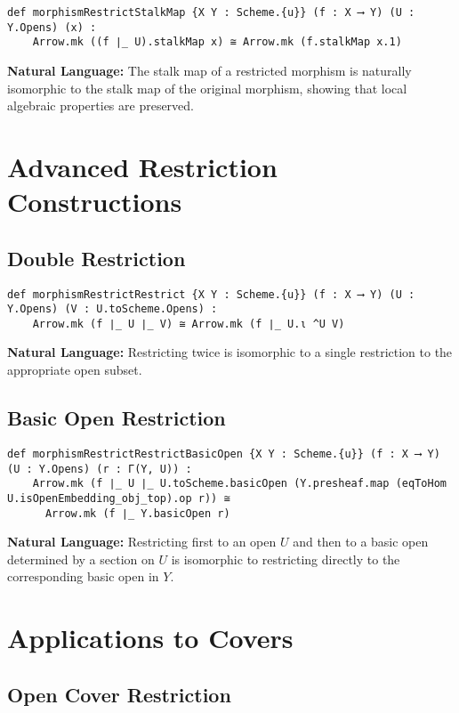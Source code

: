 \documentclass{article}
\theoremstyle{definition}
\begin{document}
\begin{lstlisting}
def morphismRestrictStalkMap {X Y : Scheme.{u}} (f : X ⟶ Y) (U : Y.Opens) (x) :
    Arrow.mk ((f ∣_ U).stalkMap x) ≅ Arrow.mk (f.stalkMap x.1)
\end{lstlisting}

\textbf{Natural Language:} The stalk map of a restricted morphism is naturally isomorphic to the stalk map of the original morphism, showing that local algebraic properties are preserved.

\section{Advanced Restriction Constructions}

\subsection{Double Restriction}

\begin{lstlisting}
def morphismRestrictRestrict {X Y : Scheme.{u}} (f : X ⟶ Y) (U : Y.Opens) (V : U.toScheme.Opens) :
    Arrow.mk (f ∣_ U ∣_ V) ≅ Arrow.mk (f ∣_ U.ι ^U V)
\end{lstlisting}

\textbf{Natural Language:} Restricting twice is isomorphic to a single restriction to the appropriate open subset.

\subsection{Basic Open Restriction}

\begin{lstlisting}
def morphismRestrictRestrictBasicOpen {X Y : Scheme.{u}} (f : X ⟶ Y) (U : Y.Opens) (r : Γ(Y, U)) :
    Arrow.mk (f ∣_ U ∣_ U.toScheme.basicOpen (Y.presheaf.map (eqToHom U.isOpenEmbedding_obj_top).op r)) ≅
      Arrow.mk (f ∣_ Y.basicOpen r)
\end{lstlisting}

\textbf{Natural Language:} Restricting first to an open $U$ and then to a basic open determined by a section on $U$ is isomorphic to restricting directly to the corresponding basic open in $Y$.

\section{Applications to Covers}

\subsection{Open Cover Restriction}
\end{document}
